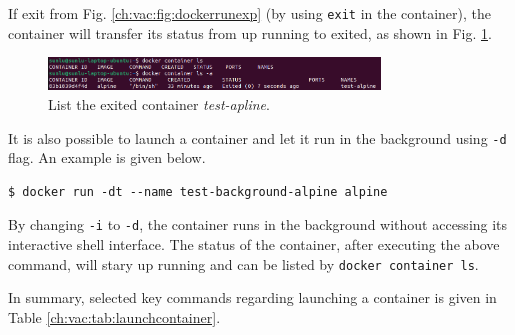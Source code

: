If exit from Fig. \ref{ch:vac:fig:dockerrunexp} (by using \verb|exit| in the container), the container will transfer its status from up running to exited, as shown in Fig. \ref{ch:vac:fig:dockerrunexppart3}.
\begin{figure}
	\centering
	\includegraphics[width=250pt]{chapters/ch_virtualization_and_containerization/figures/dockerrunexppart3.png}
	\caption{List the exited container \textit{test-apline}.} \label{ch:vac:fig:dockerrunexppart3}
\end{figure}

It is also possible to launch a container and let it run in the background using \verb|-d| flag. An example is given below.
\begin{lstlisting}
$ docker run -dt --name test-background-alpine alpine
\end{lstlisting}
By changing \verb|-i| to \verb|-d|, the container runs in the background without accessing its interactive shell interface. The status of the container, after executing the above command, will stary up running and can be listed by \verb|docker container ls|.

In summary, selected key commands regarding launching a container is given in Table \ref{ch:vac:tab:launchcontainer}.


